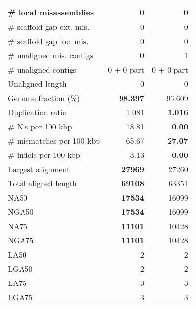 \documentclass[12pt,a4paper]{article}
\begin{document}
\begin{table}[ht]
\begin{center}
\begin{tabular}{|l*{2}{|r}|}
\# local misassemblies & 0 & 0 \\ \hline
\# scaffold gap ext. mis. & 0 & 0 \\ \hline
\# scaffold gap loc. mis. & 0 & 0 \\ \hline
\# unaligned mis. contigs & {\bf 0} & 1 \\ \hline
\# unaligned contigs & 0 + 0 part & 0 + 0 part \\ \hline
Unaligned length & 0 & 0 \\ \hline
Genome fraction (\%) & {\bf 98.397} & 96.609 \\ \hline
Duplication ratio & 1.081 & {\bf 1.016} \\ \hline
\# N's per 100 kbp & 18.81 & {\bf 0.00} \\ \hline
\# mismatches per 100 kbp & 65.67 & {\bf 27.07} \\ \hline
\# indels per 100 kbp & 3.13 & {\bf 0.00} \\ \hline
Largest alignment & {\bf 27969} & 27260 \\ \hline
Total aligned length & {\bf 69108} & 63351 \\ \hline
NA50 & {\bf 17534} & 16099 \\ \hline
NGA50 & {\bf 17534} & 16099 \\ \hline
NA75 & {\bf 11101} & 10428 \\ \hline
NGA75 & {\bf 11101} & 10428 \\ \hline
LA50 & 2 & 2 \\ \hline
LGA50 & 2 & 2 \\ \hline
LA75 & 3 & 3 \\ \hline
LGA75 & 3 & 3 \\ \hline
\end{tabular}
\end{center}
\end{table}
\end{document}
